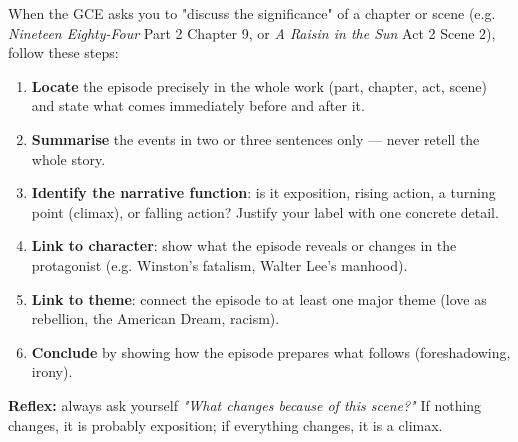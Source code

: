 \documentclass[11pt]{article}
\begin{document}
\begin{methode}
When the GCE asks you to "discuss the significance" of a chapter or scene (e.g. \emph{Nineteen Eighty-Four} Part 2 Chapter 9, or \emph{A Raisin in the Sun} Act 2 Scene 2), follow these steps:
\begin{enumerate}
\item \textbf{Locate} the episode precisely in the whole work (part, chapter, act, scene) and state what comes immediately before and after it.
\item \textbf{Summarise} the events in two or three sentences only — never retell the whole story.
\item \textbf{Identify the narrative function}: is it exposition, rising action, a turning point (climax), or falling action? Justify your label with one concrete detail.
\item \textbf{Link to character}: show what the episode reveals or changes in the protagonist (e.g. Winston's fatalism, Walter Lee's manhood).
\item \textbf{Link to theme}: connect the episode to at least one major theme (love as rebellion, the American Dream, racism).
\item \textbf{Conclude} by showing how the episode prepares what follows (foreshadowing, irony).
\end{enumerate}
\textbf{Reflex:} always ask yourself \emph{"What changes because of this scene?"} If nothing changes, it is probably exposition; if everything changes, it is a climax.
\end{methode}
\end{document}
